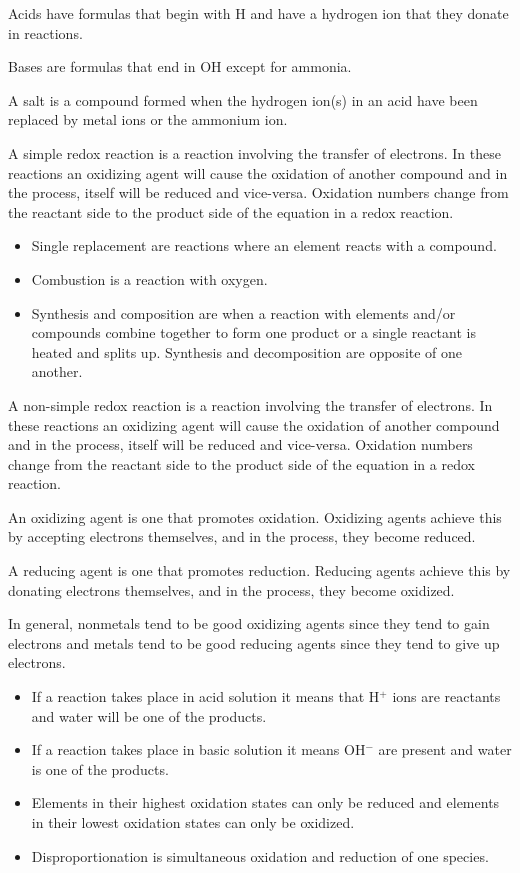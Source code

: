 \documentclass[../chem.tex]{subfiles}
\begin{document}
Acids have formulas that begin with H and have a hydrogen ion that they donate in reactions.

Bases are formulas that end in OH except for ammonia.

A salt is a compound formed when the hydrogen ion(s) in an acid have been replaced by metal ions or the ammonium ion.

A simple redox reaction is a reaction involving the transfer of electrons. In these reactions an oxidizing agent will cause the oxidation of another 
compound and in the process, itself will be reduced and vice-versa. Oxidation numbers change from the reactant side to the product side of the equation 
in a redox reaction.
\begin{itemize}
    \item Single replacement are reactions where an element reacts with a compound. 
    \item Combustion is a reaction with oxygen.
    \item Synthesis and composition are when a reaction with elements and/or compounds combine together to form one product or a single reactant is heated and splits up. Synthesis and decomposition are opposite of one another.
\end{itemize}

A non-simple redox reaction is a reaction involving the transfer of electrons. In these reactions an oxidizing agent will cause the oxidation 
of another compound and in the process, itself will be reduced and vice-versa. Oxidation numbers change from the reactant side to the product side of the equation in a redox reaction.

An oxidizing agent is one that promotes oxidation. Oxidizing agents achieve this by accepting electrons themselves, and in the process, they become reduced.

A reducing agent is one that promotes reduction. Reducing agents achieve this by donating electrons themselves, and in the process, they become oxidized.

In general, nonmetals tend to be good oxidizing agents since they tend to gain electrons and metals tend to be good reducing agents since they tend to give up electrons.
\begin{itemize}
    \item If a reaction takes place in acid solution it means that H$^+$ ions are reactants and water will be one of the products.
    \item If a reaction takes place in basic solution it means OH$^-$ are present and water is one of the products.
    \item Elements in their highest oxidation states can only be reduced and elements in their lowest oxidation states can only be oxidized.
    \item Disproportionation is simultaneous oxidation and reduction of one species.
\end{itemize}
\end{document}
